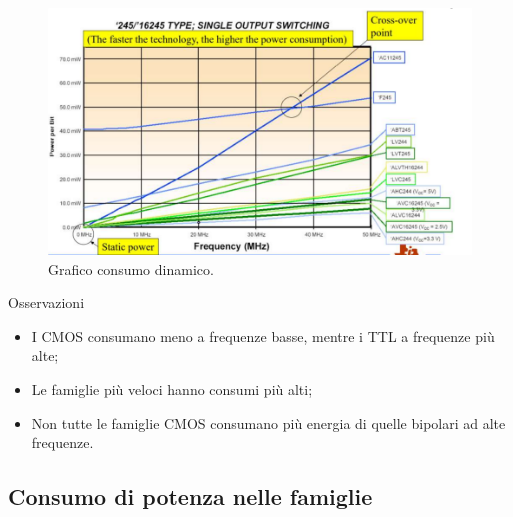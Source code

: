 \documentclass[
]{book}
\begin{document}
\begin{figure}
\centering
\includegraphics[width=0.5\linewidth,height=\textheight,keepaspectratio]{assets/imgs/consumo_dinamico.png}
\caption{Grafico consumo dinamico.}
\end{figure}

\begin{redbox}{Osservazioni}
\begin{itemize}
\item I CMOS consumano meno a frequenze basse, mentre i TTL a frequenze più alte;
\item Le famiglie più veloci hanno consumi più alti;
\item Non tutte le famiglie CMOS consumano più energia di quelle bipolari ad alte frequenze.
\end{itemize}
\end{redbox}

\subsection{Consumo di potenza nelle
famiglie}\label{consumo-di-potenza-nelle-famiglie}
\end{document}
